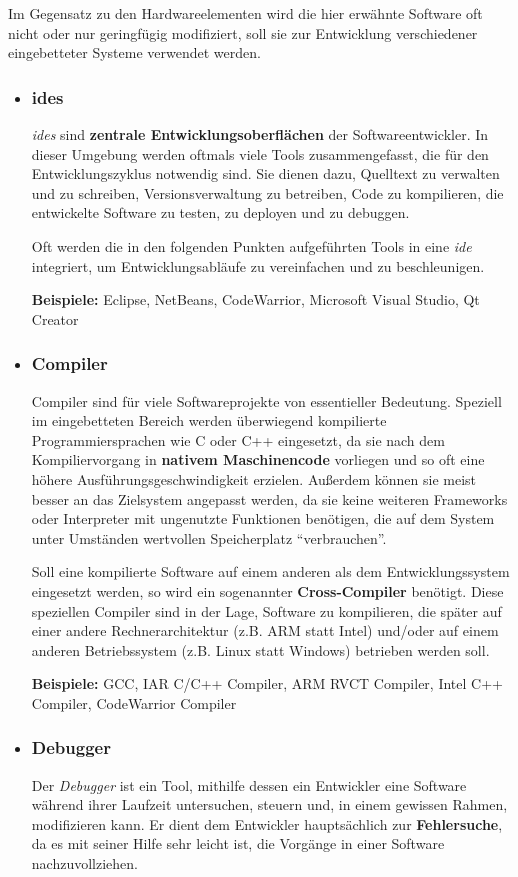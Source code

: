 Im Gegensatz zu den Hardwareelementen wird die hier erwähnte Software oft
nicht oder nur geringfügig modifiziert, soll sie zur Entwicklung verschiedener
eingebetteter Systeme verwendet werden.
\begin{itemize}
  \item \subsubsection*{\glspl{ide}} \emph{\glspl{ide}} sind \textbf{zentrale
  Entwicklungsoberflächen} der Softwareentwickler. In dieser Umgebung werden
  oftmals viele Tools zusammengefasst, die für den Entwicklungszyklus notwendig
  sind. Sie dienen dazu, Quelltext zu verwalten und zu schreiben,
  Versionsverwaltung zu betreiben, Code zu kompilieren, die entwickelte Software
  zu testen, zu deployen und zu debuggen.
  
  Oft werden die in den folgenden Punkten aufgeführten Tools in eine
  \emph{\gls{ide}} integriert, um Entwicklungsabläufe zu vereinfachen und zu
  beschleunigen.
  
  \textbf{Beispiele:} Eclipse, NetBeans, CodeWarrior, Microsoft Visual Studio,
  Qt Creator
  \item \subsubsection*{Compiler} Compiler sind für viele Softwareprojekte von
  essentieller Bedeutung. Speziell im eingebetteten Bereich werden überwiegend
  kompilierte Programmiersprachen wie C oder C++ eingesetzt, da sie nach dem
  Kompiliervorgang in \textbf{nativem Maschinencode} vorliegen und so oft eine
  höhere Ausführungsgeschwindigkeit erzielen. Außerdem können sie meist
  besser an das Zielsystem angepasst werden, da sie keine weiteren Frameworks
  oder Interpreter mit ungenutzte Funktionen benötigen, die auf dem System
  unter Umständen wertvollen Speicherplatz "`verbrauchen"'.
  
  Soll eine kompilierte Software auf einem anderen als dem Entwicklungssystem
  eingesetzt werden, so wird ein sogenannter \textbf{Cross-Compiler} benötigt.
  Diese speziellen Compiler sind in der Lage, Software zu kompilieren, die
  später auf einer andere Rechnerarchitektur (z.B. ARM statt Intel) und/oder auf
  einem anderen Betriebssystem (z.B. Linux statt Windows) betrieben werden soll.
  
  \textbf{Beispiele:} GCC, IAR C/C++ Compiler, ARM RVCT Compiler, Intel C++
  Compiler, CodeWarrior Compiler
  \item \subsubsection*{Debugger}\label{subs:swdebugger} Der \emph{Debugger} ist
  ein Tool, mithilfe dessen ein Entwickler eine Software während ihrer Laufzeit
  untersuchen, steuern und, in einem gewissen Rahmen, modifizieren kann. Er
  dient dem Entwickler hauptsächlich zur \textbf{Fehlersuche}, da es mit seiner
  Hilfe sehr leicht ist, die Vorgänge in einer Software nachzuvollziehen.
  

\end{itemize}
